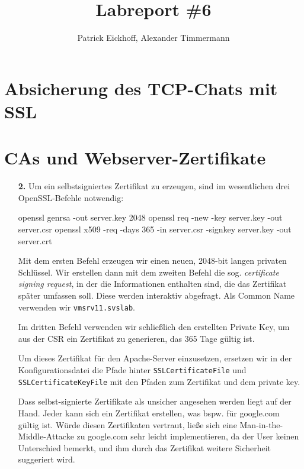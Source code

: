 \documentclass[a4paper,12bpt]{scrartcl}
\author{Patrick Eickhoff, Alexander Timmermann}
\title{Labreport \#6}
\date{}
\begin{document}
\maketitle
\section{Absicherung des TCP-Chats mit SSL}
\label{sec:tcp_chat}

\section{CAs und Webserver-Zertifikate}
\label{sec:certs}

\begin{enumerate}
    \item[\bfseries 2.]
        Um ein selbstsigniertes Zertifikat zu erzeugen, sind im wesentlichen drei
        OpenSSL-Befehle notwendig:

        \begin{usercommands}
openssl genrsa -out server.key 2048
openssl req -new -key server.key -out server.csr
openssl x509 -req -days 365 -in server.csr -signkey server.key -out server.crt
        \end{usercommands}

        Mit dem ersten Befehl erzeugen wir einen neuen, 2048-bit langen privaten
        Schlüssel. Wir erstellen dann mit dem zweiten Befehl die sog.
        \textit{certificate signing request}, in der die Informationen enthalten
        sind, die das Zertifikat später umfassen soll. Diese werden interaktiv
        abgefragt. Als Common Name verwenden wir \texttt{vmsrv11.svslab}.

        Im dritten Befehl verwenden wir schließlich den erstellten Private Key,
        um aus der CSR ein Zertifikat zu generieren, das 365 Tage gültig ist.

        Um dieses Zertifikat für den Apache-Server einzusetzen, ersetzen wir in
        der Konfigurationsdatei die Pfade hinter \texttt{SSLCertificateFile} und
        \texttt{SSLCertificateKeyFile} mit den Pfaden zum Zertifikat und dem
        private key.

        Dass selbst-signierte Zertifikate als unsicher angesehen werden liegt auf
        der Hand. Jeder kann sich ein Zertifikat erstellen, was bspw. für google.com
        gültig ist. Würde diesen Zertifikaten vertraut, ließe sich eine Man-in-the-Middle-Attacke
        zu google.com sehr leicht implementieren, da der User keinen Unterschied
        bemerkt, und ihm durch das Zertifikat weitere Sicherheit suggeriert wird.


\end{enumerate}
\end{document}
